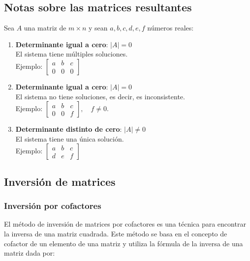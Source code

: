 \subsection*{Notas sobre las matrices resultantes}
\label{sec:0_notas_sobre_las_matrices_resultantes}

Sea $A$ una matriz de $m \times n$ y sean $a, b, c, d, e, f$ números reales:

\begin{enumerate}
    \item \textbf{Determinante igual a cero}: $|A| = 0$ \\ El sistema tiene múltiples soluciones. \\ Ejemplo: $\left[ \begin{array}{rr|r} a & b & c \\ 0 & 0 & 0 \end{array} \right]$
    \item \textbf{Determinante igual a cero}: $|A| = 0$ \\ El sistema no tiene soluciones, es decir, es inconsistente. \\ Ejemplo: $\left[ \begin{array}{rr|r} a & b & c \\ 0 & 0 & f \end{array} \right], \quad f \neq 0$.
    \item \textbf{Determinante distinto de cero}: $|A| \neq 0$ \\ El sistema tiene una única solución. \\ Ejemplo: $\left[ \begin{array}{rr|r} a & b & c \\ d & e & f \end{array} \right]$
\end{enumerate}

\subsection*{Inversión de matrices}
\label{sec:0_inversion_de_matrices}

\subsubsection*{Inversión por cofactores}
\label{sec:0_inversion_por_cofactores}

El método de inversión de matrices por cofactores es una técnica para encontrar la inversa de una matriz cuadrada. Este método se basa en el concepto de cofactor de un elemento de una matriz y utiliza la fórmula de la inversa de una matriz dada por:

